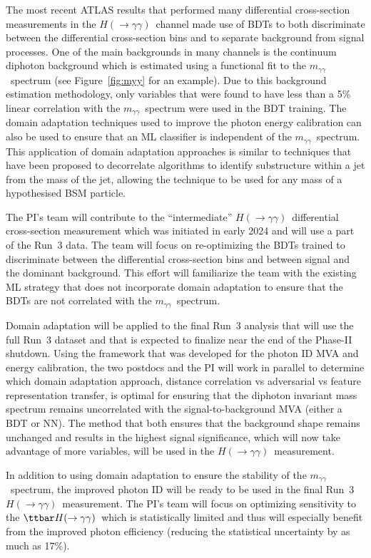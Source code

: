 \documentclass[letter, USenglish, 11pt, subfigure]{article}
\newcommand{\tthyy}{\ensuremath{\ttbar H(\to\gamma\gamma)}}
\newcommand{\myy}{\ensuremath{m_{\gamma\gamma}}}
\newcommand{\hyy}{\ensuremath{H(\to\gamma\gamma)}}
\begin{document}
The most recent ATLAS results that performed many differential cross-section measurements in the \hyy\ channel made use of BDTs to both discriminate between the differential cross-section bins and to separate background from signal processes. One of the main backgrounds in many channels is the continuum diphoton background which is estimated using a functional fit to the \myy\ spectrum (see Figure~\ref{fig:myy} for an example). Due to this background estimation methodology, only variables that were found to have less than a 5\% linear correlation with the \myy\ spectrum were used in the BDT training. The domain adaptation techniques used to improve the photon energy calibration can also be used to ensure that an ML classifier is independent of the \myy\ spectrum. This application of domain adaptation approaches is similar to techniques that have been proposed to decorrelate algorithms to identify substructure within a jet from the mass of the jet, allowing the technique to be used for any mass of a hypothesised BSM particle.

The PI's team will contribute to the ``intermediate'' \hyy\ differential cross-section measurement which was initiated in early 2024 and will use a part of the Run~3 data. The team will focus on re-optimizing the BDTs trained to discriminate between the differential cross-section bins and between signal and the dominant background. This effort will familiarize the team with the existing ML strategy that does not incorporate domain adaptation to ensure that the BDTs are not correlated with the \myy\ spectrum.

Domain adaptation will be applied to the final Run~3 analysis that will use the full Run~3 dataset and that is expected to finalize near the end of the Phase-II shutdown. Using the framework that was developed for the photon ID MVA and energy calibration, the two postdocs and the PI will work in parallel to determine which domain adaptation approach, distance correlation vs adversarial vs feature representation transfer, is optimal for ensuring that the diphoton invariant mass spectrum remains uncorrelated with the signal-to-background MVA (either a BDT or NN). The method that both ensures that the background shape remains unchanged and results in the highest signal significance, which will now take advantage of more variables, will be used in the \hyy\ measurement.

In addition to using domain adaptation to ensure the stability of the \myy\ spectrum, the improved photon ID will be ready to be used in the final Run~3 \hyy\ measurement. The PI's team will focus on optimizing sensitivity to the \tthyy\ which is statistically limited and thus will especially benefit from the improved photon efficiency (reducing the statistical uncertainty by as much as 17\%).
\end{document}
